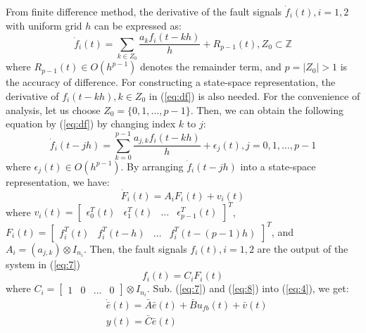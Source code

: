 \documentclass{ieeeaccess}
\begin{document}
From finite difference method, the derivative of the fault signals $\dot{f}_i(t), i=1,2$ with uniform grid $h$ can be expressed as:
\begin{equation} \label{eq:df}
    \dot{f}_i(t)=\sum_{k\in{Z_0}}\frac{a_k f_i(t-kh)}{h} + R_{p-1}(t), Z_0\subset\mathbb{Z}
\end{equation}
where $R_{p-1}(t)\in O(h^{p-1})$ denotes the remainder term, and $p=\vert{Z_0}\vert > 1$ is the accuracy of difference. For constructing a state-space representation, the derivative of $f_i(t-kh),k\in{Z_0}$ in (\ref{eq:df}) is also needed. For the convenience of analysis, let us choose $Z_0=\{ 0,1,\dots,p-1 \}$. Then, we can obtain the following equation by (\ref{eq:df}) by changing index $k$ to $j$:
\begin{equation} \label{eq:df1}
    \dot{f}_i(t-jh)=\sum_{k=0}^{p-1}\frac{a_{j,k} f_i(t-kh)}{h}+\epsilon_j(t), j=0,1,\dots,p-1
\end{equation}
where $\epsilon_j(t)\in O(h^{p-1})$. By arranging $\dot{f}_i(t-jh)$ into a state-space representation, we have:
\begin{equation} \label{eq:7}
    \dot{F}_i(t)=A_iF_i(t)+v_i(t)
\end{equation}
where $v_i(t)=\begin{bmatrix}
    \epsilon_0^T(t) & \epsilon_1^T(t) & \dots & \epsilon_{p-1}^T(t)
\end{bmatrix}^T$, $F_i(t)=\begin{bmatrix}
    f_i^T(t) & f_i^T(t-h) & \dots & f_i^T(t-(p-1)h)
\end{bmatrix}^T$, and $A_i=(a_{j,k})\otimes I_{n_i}$. Then, the fault signals $f_i(t), i=1,2$ are the output of the system in (\ref{eq:7})
\begin{equation} \label{eq:8}
    f_i(t)=C_iF_i(t)
\end{equation}
where $C_i=\begin{bmatrix}
    1 & 0 & \dots & 0
\end{bmatrix}\otimes I_{n_i}$. Sub. (\ref{eq:7}) and (\ref{eq:8}) into (\ref{eq:4}), we get:
\begin{equation} \label{eq:9}
    \begin{split}
        & \dot{\bar{e}}(t) = \bar{A}\bar{e}(t)+\bar{B}u_{fb}(t)+\bar{v}(t) \\
        & y(t)=\bar{C}\bar{e}(t)
    \end{split}
\end{equation}
\end{document}
